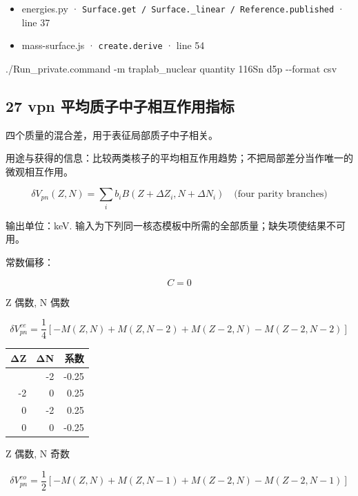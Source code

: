 \documentclass[
  11pt,
  letterpaper,
]{article}
\newenvironment{Shaded}{}{}
\newcommand{\AttributeTok}[1]{\textcolor[rgb]{0.49,0.56,0.16}{#1}}
\newcommand{\ExtensionTok}[1]{#1}
\newcommand{\NormalTok}[1]{#1}
\providecommand{\tightlist}{%
  \setlength{\itemsep}{0pt}\setlength{\parskip}{0pt}}
\begin{document}
\begin{itemize}
\tightlist
\item
  energies.py ·
  \texttt{Surface.get\ /\ Surface.\_linear\ /\ Reference.published} ·
  line 37
\item
  mass-surface.js · \texttt{create.derive} · line 54
\end{itemize}

\begin{Shaded}
\begin{Highlighting}[]
\ExtensionTok{./Run\_private.command} \AttributeTok{{-}m}\NormalTok{ traplab\_nuclear quantity 116Sn d5p }\AttributeTok{{-}{-}format}\NormalTok{ csv}
\end{Highlighting}
\end{Shaded}

\subsection{27 vpn
平均质子中子相互作用指标}\label{vpn-ux5e73ux5747ux8d28ux5b50ux4e2dux5b50ux76f8ux4e92ux4f5cux7528ux6307ux6807}

四个质量的混合差，用于表征局部质子中子相关。

用途与获得的信息：比较两类核子的平均相互作用趋势；不把局部差分当作唯一的微观相互作用。

\[
\delta V_{pn}(Z,N)=\sum_i b_i B(Z+\Delta Z_i,N+\Delta N_i)\quad\text{(four parity branches)}
\]

输出单位：keV.
输入为下列同一核态模板中所需的全部质量；缺失项使结果不可用。

常数偏移：

\[
C=0
\]

Z 偶数, N 偶数

\[
\delta V_{pn}^{ee}=\frac14[-M(Z,N)+M(Z,N-2)+M(Z-2,N)-M(Z-2,N-2)]
\]

\begin{longtable}[]{@{}rrr@{}}
\toprule\noalign{}
ΔZ & ΔN & 系数 \\
\midrule\noalign{}
\endhead
\bottomrule\noalign{}
\endlastfoot
-2 & -2 & -0.25 \\
-2 & 0 & 0.25 \\
0 & -2 & 0.25 \\
0 & 0 & -0.25 \\
\end{longtable}

Z 偶数, N 奇数

\[
\delta V_{pn}^{eo}=\frac12[-M(Z,N)+M(Z,N-1)+M(Z-2,N)-M(Z-2,N-1)]
\]
\end{document}
